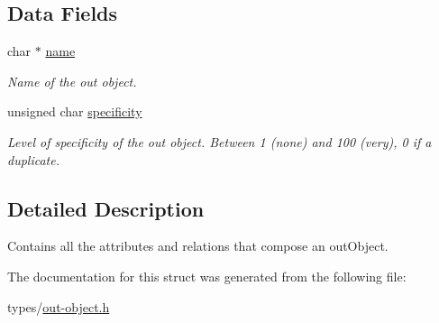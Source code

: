 \subsection*{Data Fields}
\begin{DoxyCompactItemize}
\item 
char $\ast$ \hyperlink{struct_out_object_a5ac083a645d964373f022d03df4849c8}{name}\hypertarget{struct_out_object_a5ac083a645d964373f022d03df4849c8}{}\label{struct_out_object_a5ac083a645d964373f022d03df4849c8}

\begin{DoxyCompactList}\small\item\em Name of the out object. \end{DoxyCompactList}\item 
unsigned char \hyperlink{struct_out_object_a0905deacdc107117a650b165cacc1252}{specificity}\hypertarget{struct_out_object_a0905deacdc107117a650b165cacc1252}{}\label{struct_out_object_a0905deacdc107117a650b165cacc1252}

\begin{DoxyCompactList}\small\item\em Level of specificity of the out object. Between 1 (none) and 100 (very), 0 if a duplicate. \end{DoxyCompactList}\end{DoxyCompactItemize}


\subsection{Detailed Description}
Contains all the attributes and relations that compose an out\+Object. 

The documentation for this struct was generated from the following file\+:\begin{DoxyCompactItemize}
\item 
types/\hyperlink{out-object_8h}{out-\/object.\+h}\end{DoxyCompactItemize}

